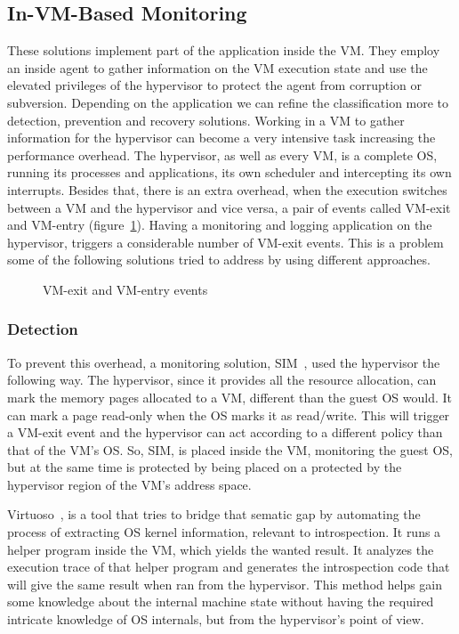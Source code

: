 \subsection{In-\ac{VM}-Based Monitoring}\label{sub:invm}
These solutions implement part of the application inside the \ac{VM}. They employ an inside agent to gather information on the \ac{VM} execution state and use the elevated privileges of the hypervisor to protect the agent from corruption or subversion. Depending on the application we can refine the classification more to detection, prevention and recovery solutions. Working in a \ac{VM} to gather information for the hypervisor can become a very intensive task increasing the performance overhead. The hypervisor, as well as every \ac{VM}, is a complete \ac{OS}, running its processes and applications, its own scheduler and intercepting its own interrupts. Besides that, there is an extra overhead, when the execution switches between a \ac{VM} and the hypervisor and vice versa, a pair of events called VM-exit and VM-entry (figure~\ref{fig:vmevents}). Having a monitoring and logging application on the hypervisor, triggers a considerable number of VM-exit events. This is a problem some of the following solutions tried to address by using different approaches.

\begin{figure}[ht]
	\centering
	
	\caption{VM-exit and VM-entry events}
	\label{fig:vmevents}
\end{figure}

\subsubsection{Detection}

To prevent this overhead, a monitoring solution, SIM~\cite{sharif2009secure}, used the hypervisor the following way. The hypervisor, since it provides all the resource allocation, can mark the memory pages allocated to a \ac{VM}, different than the guest \ac{OS} would. It can mark a page read-only when the \ac{OS} marks it as read/write. This will trigger a \ac{VM}-exit event and the hypervisor can act according to a different policy than that of the \ac{VM}’s \ac{OS}. So, SIM, is placed inside the \ac{VM}, monitoring the guest \ac{OS}, but at the same time is protected by being placed on a protected by the hypervisor region of the \ac{VM}’s address space. 

\par Virtuoso~\cite{dolan2011virtuoso}, is a tool that tries to bridge that sematic gap by automating the process of extracting \ac{OS} kernel information, relevant to introspection. It runs a helper program inside the \ac{VM}, which yields the wanted result. It analyzes the execution trace of that helper program and generates the introspection code that will give the same result when ran from the hypervisor. This method helps gain some knowledge about the internal machine state without having the required intricate knowledge of \ac{OS} internals, but from the hypervisor’s point of view. 


